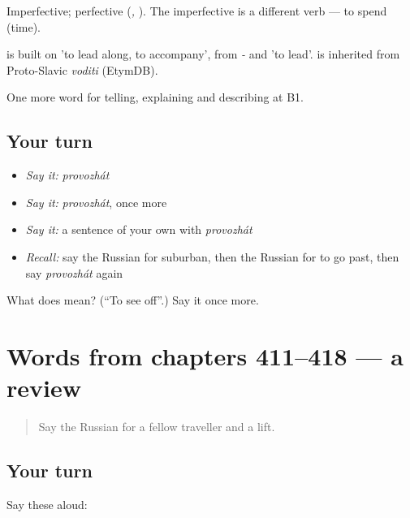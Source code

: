 Imperfective; perfective \emph{} (\emph{, }). The imperfective \emph{} is a different verb — to spend (time).

\begin{cousinweb}
\emph{} is built on \emph{} 'to lead along, to accompany', from \emph{-} and \emph{} 'to lead'. \emph{} is inherited from Proto-Slavic \emph{voditi} (EtymDB).
\end{cousinweb}

\begin{grammarlens}[title={What you've built}]
One more word for telling, explaining and describing at B1.
\end{grammarlens}

\subsection*{Your turn}
\begin{itemize}
\raggedright
  \item \emph{Say it:} \emph{provozhát}
  \item \emph{Say it:} \emph{provozhát}, once more
  \item \emph{Say it:} a sentence of your own with \emph{provozhát}
  \item \emph{Recall:} say the Russian for suburban, then the Russian for to go past, then say \emph{provozhát} again
\end{itemize}

\begin{tcolorbox}[breakable,colback=teal!4,colframe=teal!35!black,title={Before you move on}]
What does  mean? (\textquotedblleft{}To see off\textquotedblright{}.) Say it once more.
\end{tcolorbox}
\section[(dialogue)]{Words from chapters 411–418 — a review}

\label{lesson:RU-R418-review-411-418}



\begin{quote}
Say the Russian for a fellow traveller and a lift.
\end{quote}

\subsection*{Your turn}
Say these aloud:

